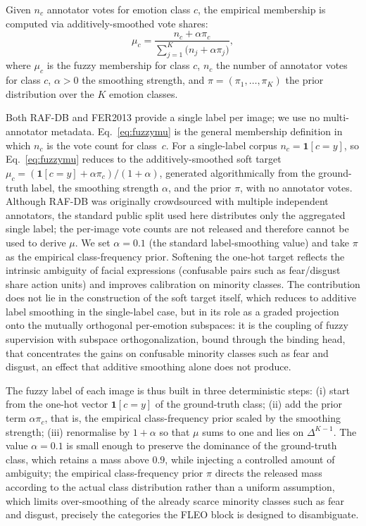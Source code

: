 \documentclass[algorithms,article,submit,moreauthors]{Definitions/mdpi}
\newcommand{\rev}[1]{\textcolor{revcolor}{#1}}
\begin{document}
 Given $n_c$ annotator votes for emotion class $c$, the empirical membership is computed via additively-smoothed vote shares:
\begin{equation}
\mu_c=\frac{n_c+\alpha\pi_c}{\sum_{j=1}^{K}\!\bigl(n_j+\alpha\pi_j\bigr)},
\label{eq:fuzzymu}
\end{equation}
\rev{where $\mu_c$ is the fuzzy membership for class $c$, $n_c$ the number of annotator votes for class $c$, $\alpha > 0$ the smoothing strength, and $\pi = (\pi_1, \dots, \pi_K)$ the prior distribution over the $K$ emotion classes.}


\rev{Both RAF-DB and FER2013 provide a single label per image; we use no
multi-annotator metadata. Eq.~\eqref{eq:fuzzymu} is the general membership
definition in which \mbox{$n_c$} is the vote count for class~\mbox{$c$}. For a
single-label corpus \mbox{$n_c=\mathbf{1}[c=y]$}, so Eq.~\eqref{eq:fuzzymu}
reduces to the additively-smoothed soft target
\mbox{$\mu_c=(\mathbf{1}[c=y]+\alpha\pi_c)/(1+\alpha)$}, generated
algorithmically from the ground-truth label, the smoothing strength
\mbox{$\alpha$}, and the prior \mbox{$\pi$}, with no annotator votes. Although
RAF-DB was originally crowdsourced with multiple independent annotators, the
standard public split used here distributes only the aggregated single label;
the per-image vote counts are not released and therefore cannot be used to
derive \mbox{$\mu$}. We set \mbox{$\alpha=0.1$} (the standard label-smoothing
value) and take \mbox{$\pi$} as the empirical class-frequency prior. Softening
the one-hot target reflects the intrinsic ambiguity of facial expressions
(confusable pairs such as fear/disgust share action units) and improves
calibration on minority classes. The contribution does not lie in the
construction of the soft target itself, which reduces to additive label
smoothing in the single-label case, but in its role as a graded projection onto
the mutually orthogonal per-emotion subspaces: it is the coupling of fuzzy
supervision with subspace orthogonalization, bound through the binding head,
that concentrates the gains on confusable minority classes such as fear and
disgust, an effect that additive smoothing alone does not produce.}


\rev{The fuzzy label of each image is thus built in three deterministic steps: (i) start from
the one-hot vector \mbox{$\mathbf{1}[c=y]$} of the ground-truth class; (ii) add the prior term
\mbox{$\alpha\pi_c$}, that is, the empirical class-frequency prior scaled by the smoothing
strength; (iii) renormalise by \mbox{$1+\alpha$} so that \mbox{$\mu$} sums to one and lies on
\mbox{$\Delta^{K-1}$}. The value \mbox{$\alpha=0.1$} is small enough to preserve the dominance
of the ground-truth class, which retains a mass above \mbox{$0.9$}, while injecting a
controlled amount of ambiguity; the empirical class-frequency prior \mbox{$\pi$} directs the
released mass according to the actual class distribution rather than a uniform assumption,
which limits over-smoothing of the already scarce minority classes such as fear and disgust,
precisely the categories the FLEO block is designed to disambiguate.}
\end{document}
